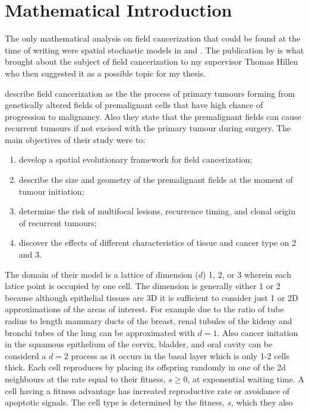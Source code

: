 \documentclass[\main/thesis.tex]{subfiles}
\begin{document}
\section{Mathematical Introduction}

The only mathematical analysis on field cancerization that could be found at 
the time of writing were spatial stochastic models in \textcite{Foo} and 
\textcite{Ryser}. The publication by \textcite{Foo} is what brought about the 
subject of field cancerization to my supervisor Thomas Hillen who then suggested 
it as a possible topic for my thesis.

\textcite{Foo} describe field cancerization as the the process of primary 
tumours forming from genetically altered fields of premalignant cells that have 
high chance of progression to malignancy. Also they state that the premalignant 
fields can cause recurrent tumours if not excised with the primary tumour during 
surgery. The main objectives of their study were to:
\begin{enumerate}
  \item develop a spatial evolutionary framework for field cancerization;
  \item describe the size and geometry of the premalignant fields at the moment 
        of tumour initiation;
  \item determine the risk of multifocal lesions, recurrence timing, and clonal 
        origin of recurrent tumours;
  \item discover the effects of different characteristics of tissue and cancer 
        type on 2 and 3.
\end{enumerate}
The domain of their model is a lattice of dimension ($d$) 1, 2, or 3 wherein 
each latice point is occupied by one cell. The dimension is generally either 1 
or 2 because although epithelial tissues are 3D it is sufficient to consider 
just 1 or 2D approximations of the areas of interest. For example due to the 
ratio of tube radius to length mammary ducts of the breast, renal tubules of the 
kideny and bronchi tubes of the lung can be approximated with $d{=}1$. Also 
cancer initation in the squamous epithelium of the cervix, bladder, and oral 
cavity can be considerd a $d {=} 2$ process as it occurs in the basal layer 
which is only 1-2 cells thick. Each cell reproduces by placing its 
offspring randomly in one of the 2d neighbours at the rate equal to their 
fitness, $s {\ge} 0$, at exponential waiting time. A cell having a fitness 
advantage has increated reproductive rate or avoidance of apoptotic 
signals. The cell type is determined by the fitness, $s$, which they also 
\end{document}
